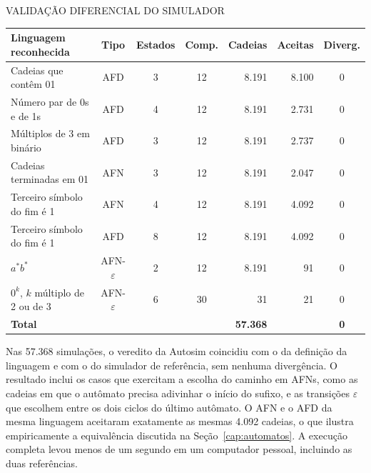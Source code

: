 \documentclass[
    12pt
    ,oneside
    ,a4paper
    ,chapter=TITLE
    ,section=TITLE
    ,sumario=abnt-6027-2012]{abntex2}
\begin{document}
\begin{quadro}[h]
    \centering
    \caption{VALIDAÇÃO DIFERENCIAL DO SIMULADOR}
    \label{quad:diferencial}
    \small
    \begin{tabularx}{\textwidth}{|Z|c|c|c|r|r|c|}
        \hline
        \textbf{Linguagem reconhecida} & \textbf{Tipo} & \textbf{Estados} & \textbf{Comp.} & \textbf{Cadeias} & \textbf{Aceitas} & \textbf{Diverg.} \\
        \hline
        Cadeias que contêm 01               & AFD             & 3 & 12 & 8.191 & 8.100 & 0 \\
        \hline
        Número par de 0s e de 1s            & AFD             & 4 & 12 & 8.191 & 2.731 & 0 \\
        \hline
        Múltiplos de 3 em binário           & AFD             & 3 & 12 & 8.191 & 2.737 & 0 \\
        \hline
        Cadeias terminadas em 01            & AFN             & 3 & 12 & 8.191 & 2.047 & 0 \\
        \hline
        Terceiro símbolo do fim é 1         & AFN             & 4 & 12 & 8.191 & 4.092 & 0 \\
        \hline
        Terceiro símbolo do fim é 1         & AFD             & 8 & 12 & 8.191 & 4.092 & 0 \\
        \hline
        $a^*b^*$                            & AFN-$\varepsilon$ & 2 & 12 & 8.191 & 91 & 0 \\
        \hline
        $0^k$, $k$ múltiplo de 2 ou de 3    & AFN-$\varepsilon$ & 6 & 30 & 31 & 21 & 0 \\
        \hline
        \textbf{Total}                      & & & & \textbf{57.368} & & \textbf{0} \\
        \hline
    \end{tabularx}
\end{quadro}

Nas 57.368 simulações, o veredito da Autosim coincidiu com o da definição da linguagem e com
o do simulador de referência, sem nenhuma divergência. O resultado inclui os casos que
exercitam a escolha do caminho em AFNs, como as cadeias em que o autômato precisa adivinhar o
início do sufixo, e as transições $\varepsilon$ que escolhem entre os dois ciclos do último
autômato. O AFN e o AFD da mesma linguagem aceitaram exatamente as mesmas 4.092 cadeias, o que
ilustra empiricamente a equivalência discutida na Seção~\ref{cap:automatos}. A execução
completa levou menos de um segundo em um computador pessoal, incluindo as duas referências.
\end{document}
